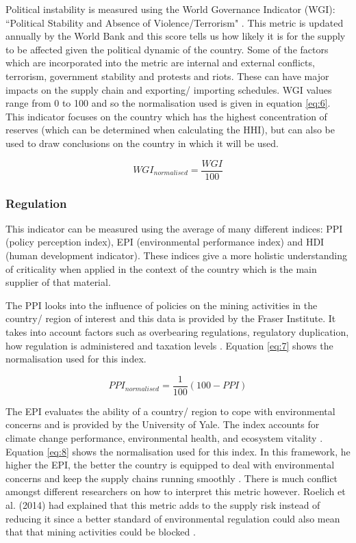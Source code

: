 \documentclass{article}
\begin{document}
Political instability is measured using the World Governance Indicator (WGI): ``Political Stability and Absence of Violence/Terrorism" \cite{Worldbank}. This metric is updated annually by the World Bank and this score tells us how likely it is for the supply to be affected given the political dynamic of the country. Some of the factors which are incorporated into the metric are internal and external conflicts, terrorism, government stability and protests and riots. These can have major impacts on the supply chain and exporting/ importing schedules. WGI values range from 0 to 100 and so the normalisation used is given in equation \ref{eq:6}. This indicator focuses on the country which has the highest concentration of reserves (which can be determined when calculating the HHI), but can also be used to draw conclusions on the country in which it will be used.

\begin{equation} \label{eq:6}
WGI_{normalised} = \frac{WGI}{100}
\end{equation}

\subsubsection{Regulation}

This indicator can be measured using the average of many different indices: PPI (policy perception index), EPI (environmental performance index) and HDI (human development indicator). These indices give a more holistic understanding of criticality when applied in the context of the country which is the main supplier of that material. 

The PPI looks into the influence of policies on the mining activities in the country/ region of interest and this data is provided by the Fraser Institute. It takes into account factors such as overbearing regulations, regulatory duplication, how regulation is administered and taxation levels \cite{fraserinstitute}. Equation \ref{eq:7} shows the normalisation used for this index. 

\begin{equation} \label{eq:7}
PPI_{normalised} = \frac{1}{100}(100-PPI)
\end{equation}

The EPI evaluates the ability of a country/ region to cope with environmental concerns and is provided by the University of Yale. The index accounts for climate change performance, environmental health, and ecosystem vitality \cite{EPI}. Equation \ref{eq:8} shows the normalisation used for this index. In this framework, he higher the EPI, the better the country is equipped to deal with environmental concerns and keep the supply chains running smoothly \cite{jasinski2018assessing}. There is much conflict amongst different researchers on how to interpret this metric however. Roelich et al. (2014) had explained that this metric adds to the supply risk instead of reducing it since a better standard of environmental regulation could also mean that that mining activities could be blocked \cite{roelich2014assessing}.
\end{document}
